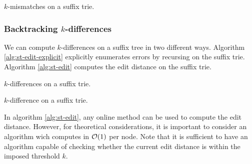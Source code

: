 \begin{algorithm}[h]
\caption{$k$-mismatches on a suffix trie.}
\label{alg:st-hamming}
\begin{algorithmic}[1]
		\State {}
	\Else 
		\ForAll {$\Cn \in \Ci(\Tn)$}
				\State {}
			\Else
				\State {}
			\EndIf
		\EndFor
	\EndIf
\EndProcedure
\end{algorithmic}
\end{algorithm}

\subsubsection{Backtracking $k$-differences}

We can compute $k$-differences on a suffix tree in two different ways. Algorithm \ref{alg:st-edit-explicit} explicitly enumerates errors by recursing on the suffix trie. Algorithm \ref{alg:st-edit} computes the edit distance on the suffix trie.

\begin{algorithm}[h]
\caption{$k$-differences on a suffix trie.}
\label{alg:st-edit-explicit}
\begin{algorithmic}[1]
		\State {}
	\Else 
		\State {}
		\ForAll {$\Cn \in \Ci(\Tn)$}
			\State {}
				\State {}
			\Else
				\State {}
			\EndIf
		\EndFor
	\EndIf
\EndProcedure
\end{algorithmic}
\end{algorithm}

\begin{algorithm}[h]
\caption{$k$-difference on a suffix trie.}
\label{alg:st-edit}
\begin{algorithmic}[1]
	\ForAll {$\Cn \in \Ci(\Tn)$}
		\State {}
	\EndFor
\EndProcedure
\end{algorithmic}
\end{algorithm}

In algorithm \ref{alg:st-edit}, any online method can be used to compute the edit distance.
However, for theoretical considerations, it is important to consider an algorithm wich computes in $\mathcal{O}(1)$ per node.
Note that it is sufficient to have an algorithm capable of checking whether the current edit distance is within the imposed threshold $k$.

